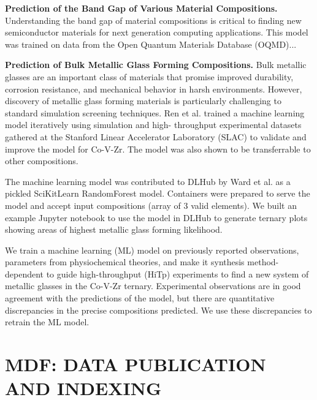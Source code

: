 \documentclass{aip-cp}
\newcommand\ben[1]{}
\newcommand\ben[1]{{\color{blue}[Ben: #1]}}
\begin{document}
\ben{Add DLHub usage details here}


\textbf{Prediction of the Band Gap of Various Material Compositions.}
Understanding the band gap of material compositions is critical
to finding new semiconductor materials for next generation computing
applications. This model was trained on data from the Open Quantum Materials
Database (OQMD)...
\ben{More model details}
\ben{Add DLHub usage details here}

\textbf{Prediction of Bulk Metallic Glass Forming Compositions.}
Bulk metallic glasses are an important class of materials that promise
improved durability, corrosion resistance, and mechanical behavior in harsh
environments. However, discovery of metallic glass forming materials is
particularly challenging to standard simulation screening techniques. Ren et
al. trained a machine learning model iteratively using simulation and high-
throughput experimental datasets gathered at the Stanford Linear Accelerator
Laboratory (SLAC) to validate and improve the model for Co-V-Zr. The model was
also shown to be transferrable to other compositions.

The machine learning model was contributed to DLHub by Ward et al. as a
pickled SciKitLearn RandomForest model. Containers were prepared to serve the
model and accept input compositions (array of 3 valid elements). We built an
example Jupyter notebook  to use the model in DLHub to generate ternary plots
showing areas of highest metallic glass forming likelihood.

\ben{cite https://github.com/fang-ren/~\cite{FangRen}}

We train a machine learning (ML) model on previously reported observations,
parameters from physiochemical theories, and make it synthesis
method-dependent to guide high-throughput (HiTp) experiments to find a new
system of metallic glasses in the Co-V-Zr ternary. Experimental observations
are in good agreement with the predictions of the model, but there are
quantitative discrepancies in the precise compositions predicted. We use these
discrepancies to retrain the ML model.

\ben{cite Ward et al (BMG Nature)~\cite{ward2016general}}


\ben{Add DLHub usage details here}

\ben{Other potential models to highlight, CANDLE Benchmarks,
Segmentation of Tomographic Reconstruction of Connectomes in Mouse Brains}


\section{MDF: DATA PUBLICATION AND INDEXING}
\end{document}
